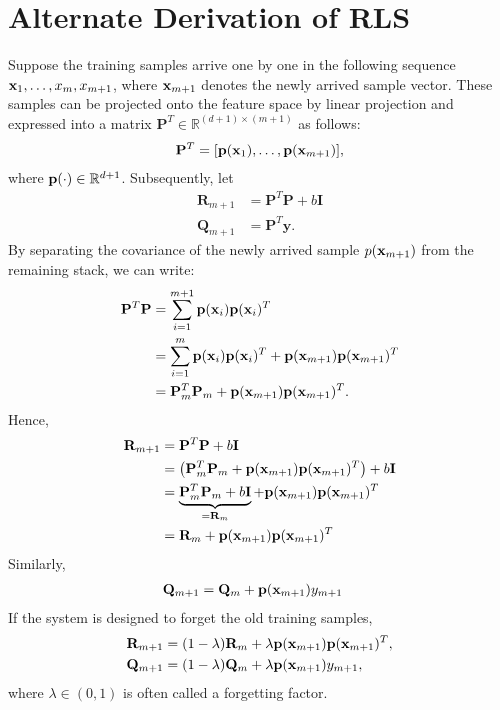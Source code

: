 \section{Alternate Derivation of RLS}
Suppose the training samples arrive one by one in the following sequence ${\mathbf{x}}_1, \dots, x_m, x_{m+1}$, where ${\mathbf{x}}_{m+1}$ denotes the newly arrived sample vector. These samples can be projected onto the feature space by linear projection and expressed into a matrix $\mathbf{P}^T \in \mathbb{R}^{(d+1)\times (m+1)}$ as follows:
\begin{align*}
	\mathbf{P}^T = [{\mathbf{p}}({\mathbf{x}}_1), \dots, {\mathbf{p}}({\mathbf{x}}_{m+1})],
\end{align*}
where ${\mathbf{p}}(\cdot)\in \mathbb{R}^{d+1}$. Subsequently, let 
\begin{align*}
	\mathbf{R}_{m+1} &= \mathbf{P}^T \mathbf{P} + b\mathbf{I}\\
	\mathbf{Q}_{m+1} &= \mathbf{P}^T \mathbf{y}.
\end{align*}
By separating the covariance of the newly arrived sample \( p({\mathbf{x}}_{m+1}) \) from the remaining stack, we can write:
\begin{align*}
	\mathbf{P}^T \mathbf{P} &= \sum_{i=1}^{m+1} {\mathbf{p}}({\mathbf{x}}_i) {\mathbf{p}}({\mathbf{x}}_i)^T\\
							&= \sum_{i=1}^m {\mathbf{p}}({\mathbf{x}}_i) {\mathbf{p}}({\mathbf{x}}_i)^T + {\mathbf{p}}({\mathbf{x}}_{m+1}) {\mathbf{p}}({\mathbf{x}}_{m+1})^T\\
							&= \mathbf{P}_m^T \mathbf{P}_m + {\mathbf{p}}({\mathbf{x}}_{m+1}) {\mathbf{p}}({\mathbf{x}}_{m+1})^T.
\end{align*}
Hence, 
\begin{align*}
	\mathbf{R}_{m+1} &= \mathbf{P}^T \mathbf{P} + b\mathbf{I}\\
					 &= \left(\mathbf{P}_m^T \mathbf{P}_m + {\mathbf{p}}({\mathbf{x}}_{m+1}) {\mathbf{p}}({\mathbf{x}}_{m+1})^T\right)+ b\mathbf{I}\\
					 &= \underbrace{\mathbf{P}_m^T \mathbf{P}_m + b\mathbf{I}}_{=\mathbf{R}_m} + {\mathbf{p}}({\mathbf{x}}_{m+1}){\mathbf{p}}({\mathbf{x}}_{m+1})^T\\
					 &= \mathbf{R}_m + {\mathbf{p}}({\mathbf{x}}_{m+1}) {\mathbf{p}}({\mathbf{x}}_{m+1})^T
\end{align*}
Similarly, 
\begin{align*}
	\mathbf{Q}_{m+1} &= \mathbf{Q}_m + {\mathbf{p}}({\mathbf{x}}_{m+1}) y_{m+1}
\end{align*}
If the system is designed to forget the old training samples, 
\begin{align*}
	\mathbf{R}_{m+1} &= (1 - \lambda) \mathbf{R}_m + \lambda {\mathbf{p}}({\mathbf{x}}_{m+1}) {\mathbf{p}}({\mathbf{x}}_{m+1})^T,\\
	\mathbf{Q}_{m+1} &= (1 - \lambda) \mathbf{Q}_m + \lambda {\mathbf{p}}({\mathbf{x}}_{m+1}) y_{m+1},
\end{align*}
where \( \lambda \in (0, 1) \) is often called a forgetting factor.

